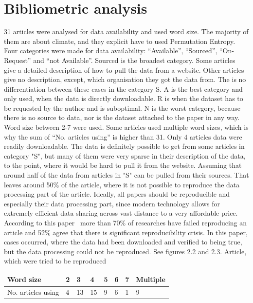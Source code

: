 \section{Bibliometric analysis}
31 articles were analysed for data availability and used word size. The majority of them are about climate, and they explicit have to used Permutation Entropy. Four categories were made for data availability: “Available”, “Sourced”, “On-Request” and “not Available”. Sourced is the broadest category. Some articles give a detailed description of how to pull the data from a website. Other articles give no description, except, which organisation they got the data from. The is no differentiation between these cases in the category S. A is the best category and only used, when the data is directly downloadable. R is when the dataset has to be requested by the author and is suboptimal. N is the worst category, because there is no source to data, nor is the dataset attached to the paper in any way. Word size between 2-7 were used. Some articles used multiple word sizes, which is why the sum of “No. articles using” is higher than 31. Only 4 articles data were readily downloadable. The data is definitely possible to get from some articles in category "S", but many of them were very sparse in their description of the data, to the point, where it would be hard to pull it from the website. Assuming that around half of the data from articles in "S" can be pulled from their sources. That leaves around 50\% of the article, where it is not possible to reproduce the data processing part of the article. Ideally, all papers should be reproducible and especially their data processing part, since modern technology allows for extremely efficient data sharing across vast distance to a very affordable price. According to this paper~\cite{Baker2016} more than 70\% of researches have failed reproducing an article and 52\% agree that there is significant reproducibility crisis. In this paper, cases occurred, where the data had been downloaded and verified to being true, but the data processing could not be reproduced. See figures 2.2 and 2.3. Article, which were tried to be reproduced~\cite{Saco2010}


\begin{table}[]
\begin{tabular}{|l|l|l|l|l|l|l|l|}
\hline
Word size & 2 & 3  & 4  & 5 & 6 & 7 & Multiple \\ \hline
No. articles using  & 4 & 13 & 15 & 9 & 6 & 1 & 9        \\ \hline
\end{tabular}
\end{table}

